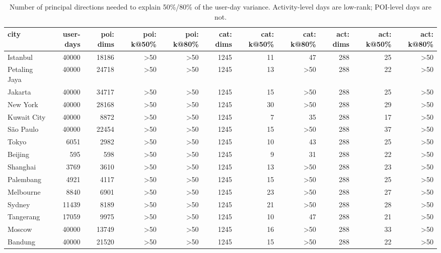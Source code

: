 \begin{table}[t]
\centering\small
\caption{Number of principal directions needed to explain 50\%/80\% of the user-day variance. Activity-level days are low-rank; POI-level days are not.}
\label{tab:A3_pca_rank}
\begin{tabular}{lrrrrrrrrrr}
\toprule
city & user-days & poi: dims & poi: k@50\% & poi: k@80\% & cat: dims & cat: k@50\% & cat: k@80\% & act: dims & act: k@50\% & act: k@80\% \\
\midrule
Istanbul & 40000 & 18186 & >50 & >50 & 1245 & 11 & 47 & 288 & 25 & >50 \\
Petaling Jaya & 40000 & 24718 & >50 & >50 & 1245 & 13 & >50 & 288 & 22 & >50 \\
Jakarta & 40000 & 34717 & >50 & >50 & 1245 & 15 & >50 & 288 & 25 & >50 \\
New York & 40000 & 28168 & >50 & >50 & 1245 & 30 & >50 & 288 & 29 & >50 \\
Kuwait City & 40000 & 8872 & >50 & >50 & 1245 & 7 & 35 & 288 & 17 & >50 \\
São Paulo & 40000 & 22454 & >50 & >50 & 1245 & 15 & >50 & 288 & 37 & >50 \\
Tokyo & 6051 & 2982 & >50 & >50 & 1245 & 10 & 43 & 288 & 25 & >50 \\
Beijing & 595 & 598 & >50 & >50 & 1245 & 9 & 31 & 288 & 22 & >50 \\
Shanghai & 3769 & 3610 & >50 & >50 & 1245 & 13 & >50 & 288 & 23 & >50 \\
Palembang & 4921 & 4117 & >50 & >50 & 1245 & 15 & >50 & 288 & 25 & >50 \\
Melbourne & 8840 & 6901 & >50 & >50 & 1245 & 23 & >50 & 288 & 27 & >50 \\
Sydney & 11439 & 8189 & >50 & >50 & 1245 & 21 & >50 & 288 & 28 & >50 \\
Tangerang & 17059 & 9975 & >50 & >50 & 1245 & 10 & 47 & 288 & 21 & >50 \\
Moscow & 40000 & 13749 & >50 & >50 & 1245 & 16 & >50 & 288 & 33 & >50 \\
Bandung & 40000 & 21520 & >50 & >50 & 1245 & 15 & >50 & 288 & 22 & >50 \\
\bottomrule
\end{tabular}
\end{table}
